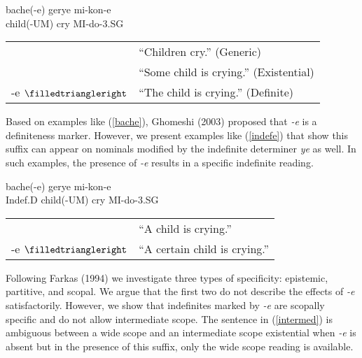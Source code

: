 \documentclass [11pt] {article}
\begin{document}
	\begin {exe}
		\ex \label{bache} \gll	bache({\color {blue}-e})	gerye	mi-kon-e\\
			child({\scriptsize -UM})	cry	{\scriptsize MI-}do{\scriptsize -3.SG}\\
			\begin {tabular} {l l}
			& ``Children cry.'' (Generic)\\
			& ``Some child is crying.'' (Existential)\\
			{\color {blue}-e} $\filledtriangleright$ & ``The child is crying.'' (Definite)\\
			\end {tabular}
	\end {exe}

Based on examples like (\ref{bache}), Ghomeshi (2003) proposed that \emph{-e} is a definiteness marker. However, we present examples like (\ref{indefe}) that show this suffix can appear on nominals modified by the indefinite determiner \emph{ye} as well. In such examples, the presence of \emph{-e} results in a specific indefinite reading.

	\begin {exe}
		\ex \label{indefe} 	bache({\color {blue}-e})	gerye	mi-kon-e\\
			{\scriptsize Indef.D}	child({\scriptsize -UM})	cry	{\scriptsize MI-}do{\scriptsize -3.SG}\\
			\begin {tabular} {l l}
			& ``A child is crying.''\\
			{\color {blue}-e} $\filledtriangleright$ & ``A certain child is crying.''\\
			\end {tabular}
	\end {exe}

Following Farkas (1994) we investigate three types of specificity: epistemic, partitive, and scopal. We argue that the first two do not describe the effects of \emph{-e} satisfactorily. However, we show that indefinites marked by \emph{-e} are scopally specific and do not allow intermediate scope. The sentence in (\ref{intermed}) is ambiguous between a wide scope and an intermediate scope existential when \emph{-e} is absent but in the presence of this suffix, only the wide scope reading is available.
\end{document}
